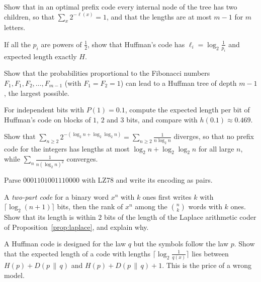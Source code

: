 \begin{exercise}[$\star$]\label{ex:fullnode}
Show that in an optimal prefix code every internal node of the tree has two children, so that $\sum_x2^{-\ell(x)}=1$, and that the lengths are at most $m-1$ for $m$ letters.
\end{exercise}

\begin{exercise}[$\star$]\label{ex:dyadichuff}
If all the $p_i$ are powers of $\frac12$, show that Huffman's code has $\ell_i=\log_2\frac1{p_i}$ and expected length exactly $H$.
\end{exercise}

\begin{exercise}[$\star\star$]\label{ex:fibonacci}
Show that the probabilities proportional to the Fibonacci numbers $F_1,F_1,F_2,\dots,F_{m-1}$ (with $F_1=F_2=1$) can lead to a Huffman tree of depth $m-1$, the largest possible.
\end{exercise}

\begin{exercise}[$\star\star$]\label{ex:blocks}
For independent bits with $P(1)=0.1$, compute the expected length per bit of Huffman's code on blocks of $1$, $2$ and $3$ bits, and compare with $h(0.1)\approx0.469$.
\end{exercise}

\begin{exercise}[$\star\star$]\label{ex:intcode}
Show that $\sum_{n\ge2}2^{-(\log_2n+\log_2\log_2n)}=\sum_{n\ge2}\frac1{n\log_2n}$ diverges, so that no prefix code for the integers has lengths at most $\log_2n+\log_2\log_2n$ for all large $n$, while $\sum_n\frac1{n(\log_2n)^2}$ converges.
\end{exercise}

\begin{exercise}[$\star$]\label{ex:lzparse}
Parse $0001101001110000$ with LZ78 and write its encoding as pairs.
\end{exercise}

\begin{exercise}[$\star\star$]\label{ex:twopart}
A \emph{two-part code} for a binary word $x^n$ with $k$ ones first writes $k$ with $\lceil\log_2(n+1)\rceil$ bits, then the rank of $x^n$ among the $\binom nk$ words with $k$ ones. Show that its length is within $2$ bits of the length of the Laplace arithmetic coder of Proposition~\ref{prop:laplace}, and explain why.
\end{exercise}

\begin{exercise}[$\star\star$]\label{ex:mismatch}
A Huffman code is designed for the law $q$ but the symbols follow the law $p$. Show that the expected length of a code with lengths $\lceil\log_2\frac1{q(x)}\rceil$ lies between $H(p)+D(p\,\|\,q)$ and $H(p)+D(p\,\|\,q)+1$. This is the price of a wrong model.
\end{exercise}

